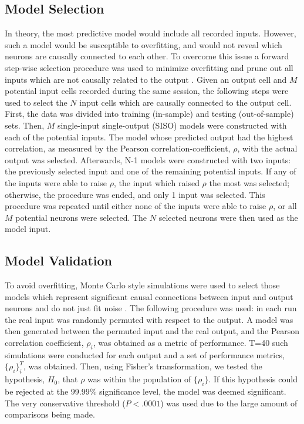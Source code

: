 \documentclass[11pt,a4paper,final]{article}
\begin{document}
    \subsection{Model Selection}
In theory, the most predictive model would include all recorded inputs.
However, such a model would be susceptible to overfitting, and would not reveal which neurons are causally connected to each other.
To overcome this issue a forward step-wise selection procedure was used to minimize overfitting and prune out all inputs which are not causally related to the output \citep{song09}.
Given an output cell and $M$ potential input cells recorded during the same session, the following steps were used to select the $N$ input cells which are causally connected to the output cell.
First, the data was divided into training (in-sample) and testing (out-of-sample) sets.
Then, $M$ single-input single-output (SISO) models were constructed with each of the potential inputs.
The model whose predicted output had the highest correlation, as measured by the Pearson correlation-coefficient, $\rho$, with the actual output was selected. Afterwards, N-1 models were constructed with two inputs: the previously selected input and one of the remaining potential inputs.
If any of the inputs were able to raise $\rho$, the input which raised $\rho$ the most was selected; otherwise, the procedure was ended, and only 1 input was selected.
This procedure was repeated until either none of the inputs were able to raise $\rho$, or all $M$ potential neurons were selected. The $N$ selected neurons were then used as the model input.

    \subsection{Model Validation}
To avoid overfitting, Monte Carlo style simulations were used to select those models which represent significant causal connections between input and output neurons and do not just fit noise \citep{zanos08}.
The following procedure was used: in each run the real input was randomly permuted with respect to the output.
A model was then generated between the permuted input and the real output, and the Pearson correlation coefficient, $\rho_{i}$, was obtained as a metric of performance.
T=40 such simulations were conducted for each output and a set of performance metrics, $\{\rho_{i}\}_{i}^{T}$, was obtained.
Then, using Fisher's transformation, we tested the hypothesis, $H_{0}$, that $\rho$ was within the population of $\{\rho_{i}\}$.
If this hypothesis could be rejected at the 99.99\% significance level, the model was deemed significant.
The very conservative threshold ($P<.0001$) was used due to the large amount of comparisons being made.
\end{document}
